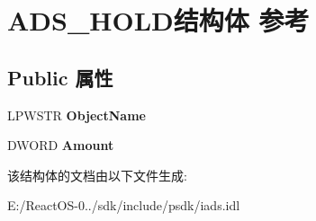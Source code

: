 \hypertarget{struct_a_d_s___h_o_l_d}{}\section{A\+D\+S\+\_\+\+H\+O\+L\+D结构体 参考}
\label{struct_a_d_s___h_o_l_d}
\subsection*{Public 属性}
\begin{DoxyCompactItemize}
\item 
\mbox{\label{struct_a_d_s___h_o_l_d_a529b66227b4dc9f3e50b371bbf75bdc5}} 
L\+P\+W\+S\+TR {\bfseries Object\+Name}
\item 
\mbox{\label{struct_a_d_s___h_o_l_d_a9f70fe7d17c7f66844a5f87ea7978016}} 
D\+W\+O\+RD {\bfseries Amount}
\end{DoxyCompactItemize}


该结构体的文档由以下文件生成\+:\begin{DoxyCompactItemize}
\item 
E\+:/\+React\+O\+S-\/0../sdk/include/psdk/iads.\+idl\end{DoxyCompactItemize}
